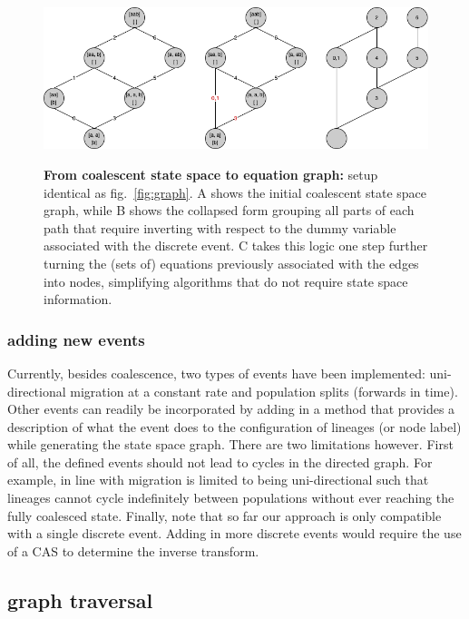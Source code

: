 \documentclass[10pt, a4]{article}
\begin{document}
\begin{figure}
\begin{center}
\includegraphics[scale=0.5]{figures/temp3.png}\label{fig:equation_graph}
\end{center}
\caption{\textbf{From coalescent state space to equation graph:} setup identical as fig.\ \ref{fig:graph}. A shows the initial coalescent state space graph, while B shows the collapsed form grouping all parts of each path that require inverting with respect to the dummy variable associated with the discrete event. C takes this logic one step further turning the (sets of) equations previously associated with the edges into nodes, simplifying algorithms that do not require state space information.}
\end{figure}

\subsubsection{adding new events}

Currently, besides coalescence, two types of events have been implemented: uni-directional migration at a constant rate and population splits (forwards in time). Other events can readily be incorporated by adding in a method that provides a description of what the event does to the configuration of lineages (or node label) while generating the state space graph. There are two limitations however. First of all, the defined events should not lead to cycles in the directed graph. For example, in line with \citet{Lohse2016} migration is limited to being uni-directional such that lineages cannot cycle indefinitely between populations without ever reaching the fully coalesced state. Finally, note that so far our approach is only compatible with a single discrete event. Adding in more discrete events would require the use of a CAS to determine the inverse transform.

\subsection{graph traversal} \label{graph_traversal}
\end{document}
